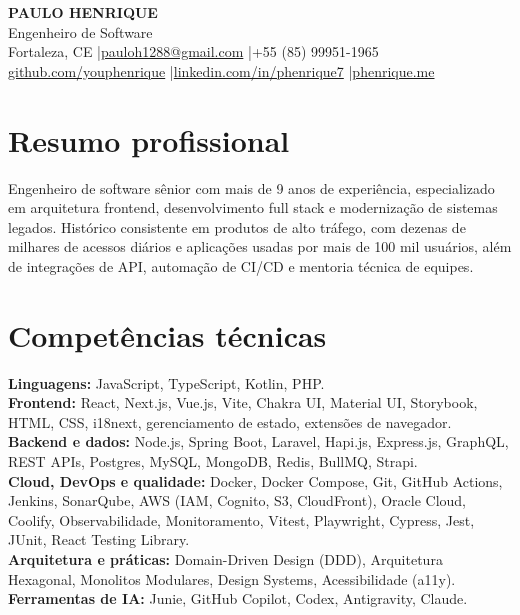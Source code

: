\documentclass[a4paper,10pt]{article}
\begin{document}
\begin{center}
  {\LARGE\bfseries PAULO HENRIQUE}\\[3pt]
  {\large Engenheiro de Software}\\[5pt]
  Fortaleza, CE
  \quad|\quad \href{mailto:pauloh1288@gmail.com}{pauloh1288@gmail.com}
  \quad|\quad +55 (85) 99951-1965\\[2pt]
  \href{https://github.com/youphenrique}{github.com/youphenrique}
  \quad|\quad \href{https://www.linkedin.com/in/phenrique7}{linkedin.com/in/phenrique7}
  \quad|\quad \href{https://www.phenrique.me}{phenrique.me}
\end{center}

\section{Resumo profissional}
Engenheiro de software s\^enior com mais de 9 anos de experi\^encia, especializado em arquitetura frontend, desenvolvimento full stack e moderniza\c{c}\~ao de sistemas legados. Hist\'orico consistente em produtos de alto tr\'afego, com dezenas de milhares de acessos di\'arios e aplica\c{c}\~oes usadas por mais de 100 mil usu\'arios, al\'em de integra\c{c}\~oes de API, automa\c{c}\~ao de CI/CD e mentoria t\'ecnica de equipes.

\section{Compet\^encias t\'ecnicas}
\textbf{Linguagens:} JavaScript, TypeScript, Kotlin, PHP.\\
\textbf{Frontend:} React, Next.js, Vue.js, Vite, Chakra UI, Material UI, Storybook, HTML, CSS, i18next, gerenciamento de estado, extens\~oes de navegador.\\
\textbf{Backend e dados:} Node.js, Spring Boot, Laravel, Hapi.js, Express.js, GraphQL, REST APIs, Postgres, MySQL, MongoDB, Redis, BullMQ, Strapi.\\
\textbf{Cloud, DevOps e qualidade:} Docker, Docker Compose, Git, GitHub Actions, Jenkins, SonarQube, AWS (IAM, Cognito, S3, CloudFront), Oracle Cloud, Coolify, Observabilidade, Monitoramento, Vitest, Playwright, Cypress, Jest, JUnit, React Testing Library.\\
\textbf{Arquitetura e pr\'aticas:} Domain-Driven Design (DDD), Arquitetura Hexagonal, Monolitos Modulares, Design Systems, Acessibilidade (a11y).\\
\textbf{Ferramentas de IA:} Junie, GitHub Copilot, Codex, Antigravity, Claude.
\end{document}
